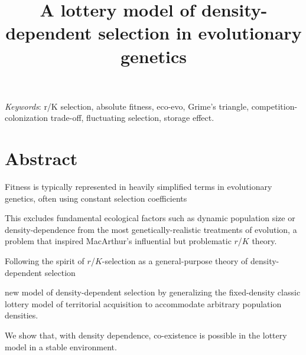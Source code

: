 \documentclass[11pt]{article}
\title{A lottery model of density-dependent selection in evolutionary genetics}
\date{}
\begin{document}
\maketitle




\bigskip


\bigskip

\textit{Keywords}: r/K selection, absolute fitness, eco-evo, Grime's triangle, competition-colonization trade-off, fluctuating selection, storage effect.

\bigskip


\bigskip


\linenumbers{}
\modulolinenumbers[1]

\newpage{}

\section*{Abstract}

Fitness is typically represented in heavily simplified terms in evolutionary genetics, often using constant selection coefficients

This excludes fundamental ecological factors such as dynamic population size or density-dependence from the most genetically-realistic treatments of evolution, a problem that inspired MacArthur's influential but problematic $r$/$K$ theory. 

Following the spirit of $r$/$K$-selection as a general-purpose theory of density-dependent selection

new model of density-dependent selection by generalizing the fixed-density classic lottery model of territorial acquisition to accommodate arbitrary population densities. 

We show that, with density dependence, co-existence is possible in the lottery model in a stable environment. 
\end{document}
